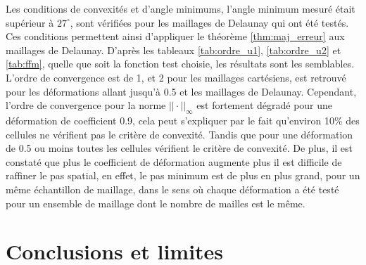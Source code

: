 \documentclass[12pt,a4paper]{article}
\begin{document}
\begin{table}[!h]
	\centering
	\caption{Ordre de convergence pour les maillages de Delaunay.}
	\label{tab:ffm}
\end{table}

Les conditions de convexités et d'angle minimums, l'angle minimum mesuré était supérieur à $27^\circ$, sont vérifiées pour les maillages de Delaunay qui ont été testés. Ces conditions permettent ainsi d'appliquer le théorème \ref{thm:maj_erreur} aux maillages de Delaunay. D'après les tableaux \ref{tab:ordre_u1}, \ref{tab:ordre_u2} et \ref{tab:ffm}, quelle que soit la fonction test choisie, les résultats sont les semblables. L'ordre de convergence est de 1, et 2 pour les maillages cartésiens, est retrouvé pour les déformations allant jusqu'à 0.5 et les maillages de Delaunay. Cependant, l'ordre de convergence pour la norme $|\!|\cdot|\!|_\infty$  est fortement dégradé pour une déformation de coefficient 0.9, cela peut s'expliquer par le fait qu'environ 10\% des cellules ne vérifient pas le critère de convexité. Tandis que pour une déformation de 0.5 ou moins toutes les cellules vérifient le critère de convexité. De plus, il est constaté que plus le coefficient de déformation augmente plus il est difficile de raffiner le pas spatial, en effet, le pas minimum est de plus en plus grand, pour un même échantillon de maillage, dans le sens où chaque déformation a été testé pour un ensemble de maillage dont le nombre de mailles est le même. 

\section{Conclusions et limites}
\end{document}
